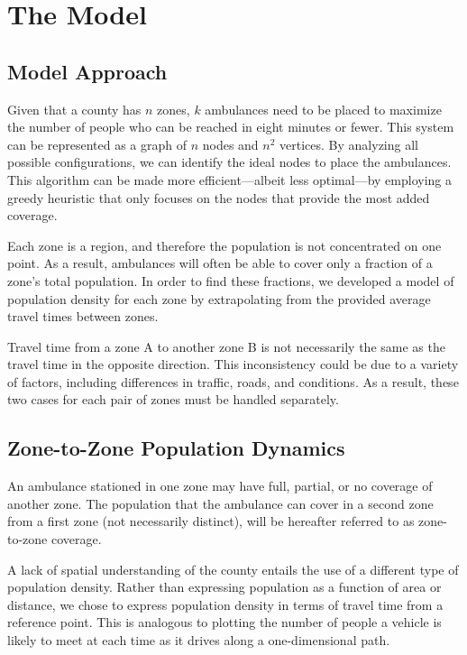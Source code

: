 \documentclass[notitlepage, 12pt]{article}
\begin{document}
\section{The Model}

\subsection{Model Approach}

Given that a county has $n$ zones, $k$ ambulances need to be placed to maximize the number of people who can be reached in eight minutes or fewer. This system can be represented as a graph of $n$ nodes and $n^2$ vertices. By analyzing all possible configurations, we can identify the ideal nodes to place the ambulances. This algorithm can be made more efficient---albeit less optimal---by employing a greedy heuristic that only focuses on the nodes that provide the most added coverage.

Each zone is a region, and therefore the population is not concentrated on one point. As a result, ambulances will often be able to cover only a fraction of a zone's total population. In order to find these fractions, we developed a model of population density for each zone by extrapolating from the provided average travel times between zones.

Travel time from a zone A to another zone B is not necessarily the same as the travel time in the opposite direction. This inconsistency could be due to a variety of factors, including differences in traffic, roads, and conditions. As a result, these two cases for each pair of zones must be handled separately.

\subsection{Zone-to-Zone Population Dynamics}
An ambulance stationed in one zone may have full, partial, or no coverage of another zone. The population
that the ambulance can cover in a second zone from a first zone (not necessarily distinct),
will be hereafter referred to as zone-to-zone coverage.

A lack of spatial understanding of the county entails the use of a different type of population density. Rather than expressing population as a function of area or distance, we chose to express population density in terms of travel time from a reference point. This is analogous to plotting the number of people a vehicle is likely to meet at each time as it drives along a one-dimensional path.
\end{document}
